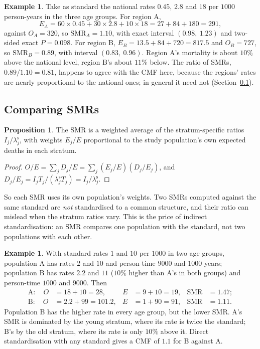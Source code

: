 \documentclass[11pt,a4paper]{article}
\numberwithin{equation}{section}
\theoremstyle{definition}
\newtheorem{exa}[thm]{Example}
\newtheorem{prop}[thm]{Proposition}
\begin{document}
\begin{exa}
\label{exa:smr}
Take as standard the national rates $0.45$, $2.8$ and $18$ per $1000$ person-years in the three age groups. For region A,
\[
E_A = 60 \times 0.45 + 30 \times 2.8 + 10 \times 18 = 27 + 84 + 180 = 291 ,
\]
against $O_A = 320$, so $\text{SMR}_A = 1.10$, with exact interval $(0.98,\ 1.23)$ and two-sided exact $P = 0.098$. For region B,
$E_B = 13.5 + 84 + 720 = 817.5$ and $O_B = 727$, so $\text{SMR}_B = 0.89$, with interval $(0.83,\ 0.96)$. Region A's mortality is about $10\%$ above
the national level, region B's about $11\%$ below. The ratio of SMRs, $0.89/1.10 = 0.81$, happens to agree with the CMF here, because the
regions' rates are nearly proportional to the national ones; in general it need not (Section~\ref{sec:smrcompare}).
\end{exa}

\subsection{Comparing SMRs}
\label{sec:smrcompare}

\begin{prop}
\label{prop:smrweights}
The SMR is a weighted average of the stratum-specific ratios $I_j/\lambda^{\text{s}}_j$, with weights $E_j/E$ proportional to the study population's own expected
deaths in each stratum.
\end{prop}

\begin{proof}
$O/E = \sum_j D_j/E = \sum_j (E_j/E)(D_j/E_j)$, and $D_j/E_j = I_j T_j/(\lambda^{\text{s}}_j T_j) = I_j/\lambda^{\text{s}}_j$.
\end{proof}

So each SMR uses its own population's weights. Two SMRs computed against the same standard are \emph{not} standardised to a common
structure, and their ratio can mislead when the stratum ratios vary. This is the price of indirect standardisation: an SMR compares one
population with the standard, not two populations with each other.

\begin{exa}
\label{exa:smrparadox}
With standard rates $1$ and $10$ per $1000$ in two age groups, population A has rates $2$ and $10$ and person-time $9000$ and $1000$ years;
population B has rates $2.2$ and $11$ ($10\%$ higher than A's in both groups) and person-time $1000$ and $9000$. Then
\begin{align*}
\text{A}: \quad O &= 18 + 10 = 28, & E &= 9 + 10 = 19, & \text{SMR} &= 1.47 ; \\
\text{B}: \quad O &= 2.2 + 99 = 101.2, & E &= 1 + 90 = 91, & \text{SMR} &= 1.11 .
\end{align*}
Population B has the higher rate in every age group, but the lower SMR. A's SMR is dominated by the young stratum, where its rate is
twice the standard; B's by the old stratum, where its rate is only $10\%$ above it. Direct standardisation with any standard gives a CMF of
$1.1$ for B against A.
\end{exa}
\end{document}
